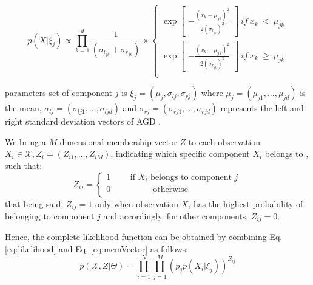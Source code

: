 \begin{equation}
p(X|\xi_j) \propto \prod_{k=1}^{d} \frac{1}{(\sigma_{l_{jk}}+\sigma_{r_{jk}})}
\times \left\{\begin{matrix}
\exp \begin{bmatrix}
-\frac{(x_k-\mu_{jk})^2}{2(\sigma_{l_{jk}})^2}
\end{bmatrix}\ if\ x_k\ <\ \mu_{jk} \\ 
\exp \begin{bmatrix}
-\frac{(x_k-\mu_{jk})^2}{2(\sigma_{r_{jk}})^2}
\end{bmatrix}\ if\ x_k\ \geqslant\ \mu_{jk} \\ 
\end{matrix}\right.
\label{eq:2}
\end{equation}

parameters set of component $j$ is $\xi_j = (\mu_j,\sigma_{lj},\sigma_{rj})$ where $\mu_j = (\mu_{j1},...,\mu_{jd})$ is the mean, $\sigma_{lj} = (\sigma_{lj1},...,\sigma_{ljd})$ and $\sigma_{rj} = (\sigma_{rj1},...,\sigma_{rjd})$ represents the left and right standard deviation vectors of AGD . 

We bring a $M$-dimensional membership vector $Z$ to each observation $X_i\in\mathcal{X}, Z_i = (Z_{i1},...,Z_{iM})$, indicating which specific component $X_i$ belongs to \cite{Bouguila2006}, such that:
\begin{equation}
Z_{ij} = \left\{\begin{matrix}
1\qquad\mbox{ if }X_i\mbox{  belongs to component }j \\
0\qquad\qquad\quad \mbox{otherwise} \qquad\qquad\quad\quad \\
\end{matrix}\right.
\label{eq:memVector}
\end{equation}
that being said, $Z_{ij} = 1$ only when observation $X_i$ has the highest probability of belonging to component $j$ and accordingly, for other components, $Z_{ij} = 0$. 

Hence, the complete likelihood function can be obtained by combining Eq. \eqref{eq:likelihood} and Eq. \eqref{eq:memVector} as follows:
\begin{equation}
p(\mathcal{X}, Z|\Theta) = \prod_{i=1}^{N}\prod_{j=1}^{M}(p_jp(X_i|\xi_j))^{Z_{ij}}
\label{eq:compPdf}
\end{equation}

